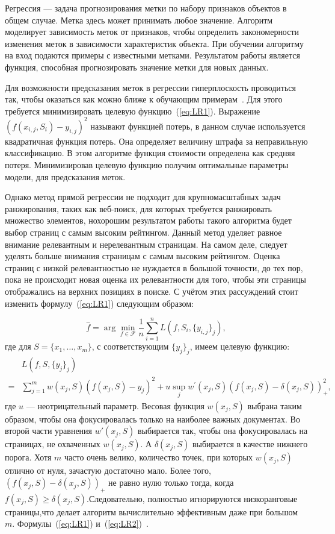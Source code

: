 Регрессия --- задача прогнозирования метки по набору признаков объектов в общем случае. Метка здесь может принимать любое значение. Алгоритм моделирует зависимость меток от признаков, чтобы определить закономерности изменения меток в зависимости характеристик объекта. При обучении алгоритму на вход подаются примеры с известными метками. Результатом работы является функция, способная прогнозировать значение метки для новых данных. 

Для возможности предсказания меток в регрессии гиперплоскость проводиться так, чтобы оказаться как можно ближе к обучающим примерам~\cite{ML_no_wors}. Для этого требуется минимизировать целевую функцию~(\ref{eq:LR1}). Выражение \\$(f(x_{i, j}, S_i)-y_{i, j})^2$ называют функцией потерь, в данном случае используется квадратичная функция потерь. Она определяет величину штрафа за неправильную классификацию. В этом алгоритме функция стоимости определена как средняя потеря. Минимизировав целевую функцию получим оптимальные параметры модели, для предсказания меток.

Однако метод прямой регрессии не подходит для крупномасштабных задач ранжирования, таких как веб-поиск, для которых требуется ранжировать множество элементов, нохорошим результатом работы такого алгоритма будет выбор страниц с самым высоким рейтингом. Данный метод уделяет равное внимание релевантным и нерелевантным страницам. На самом деле, следует уделять больше внимания страницам с самым высоким рейтингом. Оценка страниц с низкой релевантностью не нуждается в большой точности, до тех пор, пока не происходит новая оценка их релевантности для того, чтобы эти страницы отображались на верхних позициях в поиске. С учётом этих рассуждений стоит изменить формулу~(\ref{eq:LR1}) следующим образом:
	
{\begin{equation}
			\label{eq:LR2}
		\hat{f}=\arg \min _{f \in \mathcal{F}}
		\frac{1}{n} \sum_{i=1}^n L(f, S_i,\{y_{i, j}\}_j),
\end{equation}}
где для $S = \{x_{1}, \dots, x_{m}\}$, с соответствующим $\{y_{j}\}_{j}$, имеем целевую функцию:
\[
\begin{aligned}
	& L(f, S,\{y_j\}_j) \\
	= & \sum_{j=1}^m w(x_j, S)(f(x_j, S)-y_j)^2+u \sup _j w^{\prime}(x_j, S)(f(x_j, S)-\delta(x_j, S))_{+}^2,
\end{aligned}
\]
где $u$ --- неотрицательный параметр. Весовая функция $w(x_j, S)$ выбрана таким образом, чтобы она фокусировалась только на наиболее важных документах. Во второй части уравнения $w'(x_j, S)$ выбирается так, чтобы она фокусировалась на страницах, не охваченных $w(x_j, S)$.  А $\delta(x_j, S)$ выбирается в качестве нижнего порога. Хотя $m$ часто очень велико, количество точек, при которых $w(x_j, S)$ отлично от нуля, зачастую достаточно мало. Более того, $(f(x_j, S)-\delta(x_j, S))_{+}$ не равно нулю только тогда, когда $f(x_j, S) \geq \delta(x_j, S)$.Следовательно, полностью игнорируются низкоранговые страницы,что делает алгоритм вычислительно эффективным даже при большом $m$. Формулы~(\ref{eq:LR1}) и~(\ref{eq:LR2})~\cite{LR}. 

